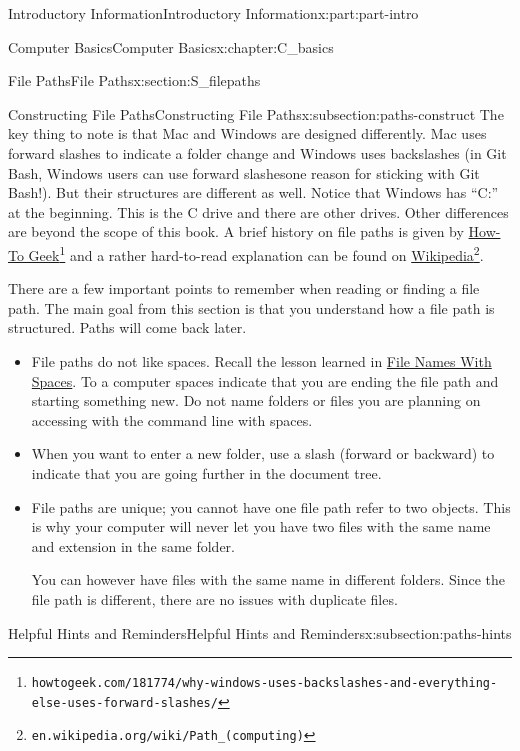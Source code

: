 \documentclass[oneside,10pt,]{book}
\begin{document}
\begin{partptx}{Introductory Information}{}{Introductory Information}{}{}{x:part:part-intro}
\begin{chapterptx}{Computer Basics}{}{Computer Basics}{}{}{x:chapter:C_basics}
\begin{sectionptx}{File Paths}{}{File Paths}{}{}{x:section:S_filepaths}
\begin{subsectionptx}{Constructing File Paths}{}{Constructing File Paths}{}{}{x:subsection:paths-construct}
The key thing to note is that Mac and Windows are designed differently. Mac uses forward slashes to indicate a folder change and Windows uses backslashes (in Git Bash, Windows users can use forward slashes\textellipsis{}one reason for sticking with Git Bash!). But their structures are different as well. Notice that Windows has ``C:'' at the beginning. This is the C drive and there are other drives. Other differences are beyond the scope of this book. A brief history on file paths is given by \href{https://www.howtogeek.com/181774/why-windows-uses-backslashes-and-everything-else-uses-forward-slashes/}{How-To Geek}\footnote{\nolinkurl{howtogeek.com/181774/why-windows-uses-backslashes-and-everything-else-uses-forward-slashes/}\label{g:fn:idm480810312}} and a rather hard-to-read explanation can be found on \href{https://en.wikipedia.org/wiki/Path_(computing)}{Wikipedia}\footnote{\nolinkurl{en.wikipedia.org/wiki/Path_(computing)}\label{g:fn:idm480808648}}.%
\par
There are a few important points to remember when reading or finding a file path. The main goal from this section is that you understand how a file path is structured. Paths will come back later.%
\begin{itemize}[label=\textbullet]
\item{}File paths do not like spaces. Recall the lesson learned in \hyperlink{x:paragraphs:namesspaces}{File Names With Spaces}. To a computer spaces indicate that you are ending the file path and starting something new. Do not name folders or files you are planning on accessing with the command line with spaces.%
\item{}When you want to enter a new folder, use a slash (forward or backward) to indicate that you are going further in the document tree.%
\item{}File paths are unique; you cannot have one file path refer to two objects. This is why your computer will never let you have two files with the same name and extension in the same folder.%
\par
You can however have files with the same name in different folders. Since the file path is different, there are no issues with duplicate files.%
\end{itemize}
%
\end{subsectionptx}
%
%
\typeout{************************************************}
\typeout{************************************************}
%
\begin{subsectionptx}{Helpful Hints and Reminders}{}{Helpful Hints and Reminders}{}{}{x:subsection:paths-hints}

\end{subsectionptx}
\end{sectionptx}
\end{chapterptx}
\end{partptx}
\end{document}
